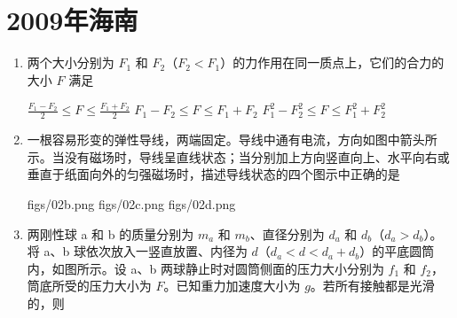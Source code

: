 \documentclass[\gkver]{gaokaozhenti}
\begin{document}
\chapter{2009年海南}

\begin{enumerate}
\item
两个大小分别为 $F_{1}$ 和 $F_{2}$（$F_{2}<F_{1}$）的力作用在同一质点上，它们的合力的大小 $F$ 满足

{$\frac{F_{1}-F_{2}}{2}\leq F\leq\frac{F_{1}+F_{2}}{2}$}
{$F_{1}-F_{2}\leq F\leq F_{1}+F_{2}$}
{$F_{1}^{2}-F_{2}^{2}\leq F\leq F_{1}^{2}+F_{2}^{2}$}


\item
一根容易形变的弹性导线，两端固定。导线中通有电流，方向如图中箭头所示。当没有磁场时，导线呈直线状态；当分别加上方向竖直向上、水平向右或垂直于纸面向外的匀强磁场时，描述导线状态的四个图示中正确的是

{figs/02b.png}
{figs/02c.png}
{figs/02d.png}


\item
两刚性球 a 和 b 的质量分别为 $m_{a}$ 和 $m_{b}$、直径分别为 $d_{a}$ 和 $d_{b}$（$d_{a}>d_{b}$）。将 a、b 球依次放入一竖直放置、内径为 $d$（$d_{a}<d<d_{a}+d_{b}$）的平底圆筒内，如图所示。设 a、b 两球静止时对圆筒侧面的压力大小分别为 $f_{1}$ 和 $f_{2}$，筒底所受的压力大小为 $F$。已知重力加速度大小为 $g$。若所有接触都是光滑的，则


\end{enumerate}
\end{document}

